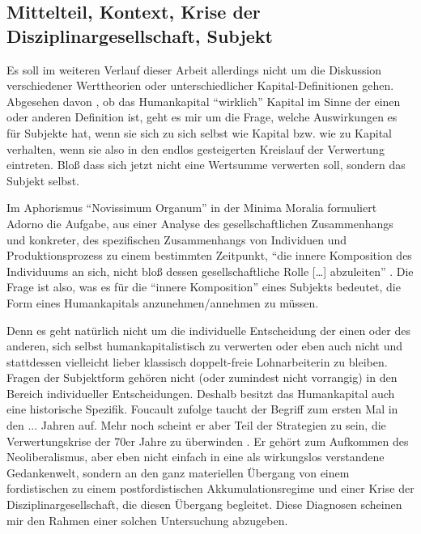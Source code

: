\documentclass[12pt,
               DIV13,
               paper=a4,
               twoside=false,
               onehalfspacing,
               bibliography=totoc,
               toc=graduated,
               draft,
               ]{scrartcl}
\newcommand{\lips}{\dots\unkern}
\newcommand{\pc}[2]{\parencite[#1]{#2}}
\newcommand{\vgl}[2]{\parencite[vgl.][#1]{#2}}
\newcommand{\worries}[1]{\ifdraft{\textcolor{blue}{\texttt{(#1)}}}{}}
\begin{document}
\subsection{Mittelteil, Kontext, Krise der Disziplinargesellschaft,
Subjekt}

Es soll im weiteren Verlauf dieser Arbeit allerdings nicht um die
Diskussion verschiedener Werttheorien oder unterschiedlicher
Kapital-Definitionen gehen. Abgesehen davon \worries{?}, ob das
Humankapital "`wirklich"' Kapital  im Sinne der einen oder anderen
Definition ist, geht es mir um die Frage, welche Auswirkungen es für
Subjekte hat, wenn sie sich zu sich selbst wie Kapital bzw. wie zu
Kapital verhalten, wenn sie also in den endlos gesteigerten Kreislauf
der Verwertung eintreten. Bloß dass sich jetzt nicht eine Wertsumme
verwerten soll, sondern das Subjekt selbst.

Im Aphorismus "`Novissimum Organum"' in der Minima Moralia formuliert
Adorno die Aufgabe, aus einer Analyse des gesellschaftlichen
Zusammenhangs und konkreter, des spezifischen Zusammenhangs von
Individuen und Produktionsprozess zu einem bestimmten Zeitpunkt, "`die
innere Komposition des Individuums an sich, nicht bloß dessen
gesellschaftliche Rolle [\lips] abzuleiten"' \pc{261}{min}. Die Frage
ist also, was es für die "`innere Komposition"' eines Subjekts
bedeutet, die Form eines Humankapitals anzunehmen/annehmen zu müssen.

Denn es geht natürlich nicht um die individuelle Entscheidung der
einen oder des anderen, sich selbst humankapitalistisch zu verwerten
oder eben auch nicht und stattdessen vielleicht lieber klassisch
doppelt-freie Lohnarbeiterin zu bleiben. Fragen der Subjektform
gehören nicht (oder zumindest nicht vorrangig) in den Bereich
individueller Entscheidungen. Deshalb besitzt das Humankapital auch
eine historische Spezifik. Foucault zufolge taucht der Begriff zum
ersten Mal in den ... Jahren \worries{?} auf. Mehr noch scheint er
aber Teil der Strategien zu sein, die Verwertungskrise der 70er Jahre
zu überwinden \worries{?} \vgl{xx}{gbp}. Er gehört zum Aufkommen des
Neoliberalismus, aber eben nicht einfach in eine als wirkungslos
verstandene Gedankenwelt, sondern an den ganz materiellen Übergang von
einem fordistischen zu einem postfordistischen Akkumulationsregime und
einer Krise der Disziplinargesellschaft, die diesen Übergang
begleitet. Diese Diagnosen scheinen mir den Rahmen einer solchen
\worries{?} Untersuchung abzugeben.
\end{document}
